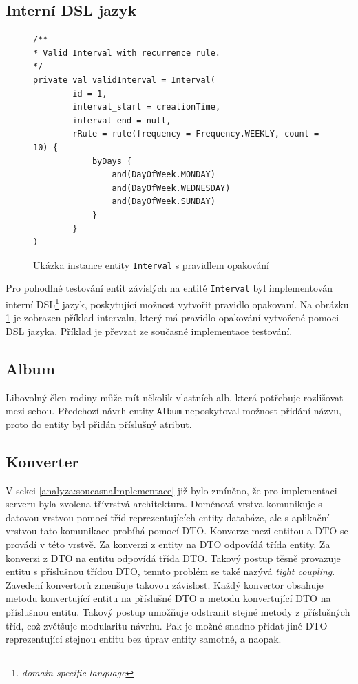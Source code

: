     \subsection{Interní DSL jazyk}\label{navrh:zmeny:dsl}
        \begin{figure} %
            \begin{verbatim}
/**
* Valid Interval with recurrence rule.
*/
private val validInterval = Interval(
        id = 1,
        interval_start = creationTime,
        interval_end = null,
        rRule = rule(frequency = Frequency.WEEKLY, count = 10) {
            byDays {
                and(DayOfWeek.MONDAY)
                and(DayOfWeek.WEDNESDAY)
                and(DayOfWeek.SUNDAY)
            }
        }
)
            \end{verbatim}
            \caption{Ukázka instance entity \texttt{Interval} s pravidlem opakování} 
            \label{code:valid-interval}
        \end{figure}
        Pro pohodlné testování entit závislých na entitě \verb|Interval| byl implementován interní DSL\footnote{\textit{domain specific language}} jazyk, poskytující možnost vytvořit pravidlo opakovaní. Na obrázku \ref{code:valid-interval} je zobrazen příklad intervalu, který má pravidlo opakování vytvořené pomoci DSL jazyka. Příklad je převzat ze současné implementace testování.

    \subsection{Album}
        Libovolný člen rodiny může mít několik vlastních alb, která potřebuje rozlišovat mezi sebou. Předchozí návrh entity \verb|Album| neposkytoval možnost přidání názvu, proto do entity byl přidán příslušný atribut.
        
    \subsection{Konverter}
        V sekci \ref{analyza:soucasnaImplementace} již bylo zmíněno, že pro implementaci serveru byla zvolena třívrstvá architektura. Doménová vrstva komunikuje s datovou vrstvou pomocí tříd reprezentujících entity databáze, ale s aplikační vrstvou tato komunikace probíhá pomocí DTO. Konverze mezi entitou a DTO se provádí v této vrstvě. Za konverzi z entity na DTO odpovídá třída entity. Za konverzi z DTO na entitu odpovídá třída DTO.
        Takový postup těsně provazuje entitu s příslušnou třídou DTO, tennto problém se také nazývá \textit{tight coupling}. Zavedení konvertorů zmenšuje takovou závislost. Každý konvertor obsahuje metodu konvertující entitu na příslušné DTO a metodu konvertující DTO na příslušnou entitu. Takový postup umožňuje odstranit stejné metody z příslušných tříd, což zvětšuje modularitu návrhu. 
        Pak je možné snadno přidat jiné DTO reprezentující stejnou entitu bez úprav entity samotné, a naopak.
        
